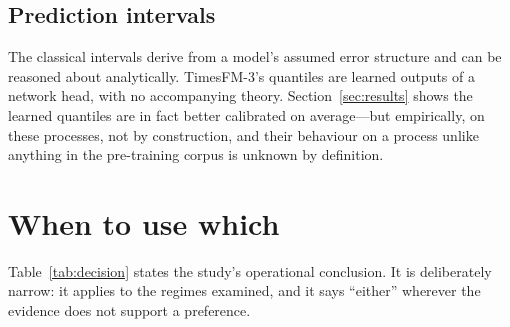 \documentclass[article]{ajs}
\providecommand{\sectionref}[1]{Section~\ref{#1}}
\providecommand{\tableref}[1]{Table~\ref{#1}}
\begin{document}
\subsection{Prediction intervals}

The classical intervals derive from a model's assumed error structure and can be reasoned about
analytically. TimesFM-3's quantiles are learned outputs of a network head, with no accompanying
theory. \sectionref{sec:results} shows the learned quantiles are in fact better calibrated on
average---but empirically, on these processes, not by construction, and their behaviour on a
process unlike anything in the pre-training corpus is unknown by definition.

\section{When to use which}
\label{sec:decision}

\tableref{tab:decision} states the study's operational conclusion. It is deliberately narrow:
it applies to the regimes examined, and it says ``either'' wherever the evidence does not
support a preference.
\end{document}
